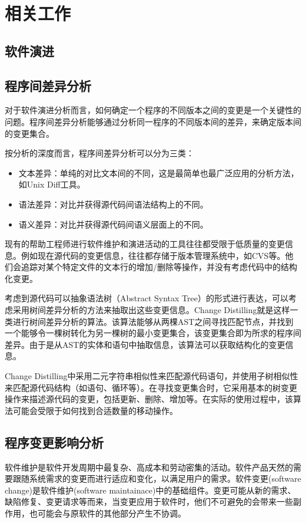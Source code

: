 \chapter{相关工作}
\section{软件演进}
\section{程序间差异分析}

对于软件演进分析而言，如何确定一个程序的不同版本之间的变更是一个关键性的问题。程序间差异分析能够通过分析同一程序的不同版本间的差异，来确定版本间的变更集合。

按分析的深度而言，程序间差异分析可以分为三类：
\begin{itemize}
	\item 文本差异：单纯的对比文本间的不同，这是最简单也最广泛应用的分析方法，如Unix Diff工具。
	\item 语法差异：对比并获得源代码间语法结构上的不同。
	\item 语义差异：对比并获得源代码间语义层面上的不同。
\end{itemize}

现有的帮助工程师进行软件维护和演进活动的工具往往都受限于低质量的变更信息。例如现在源代码的变更信息，往往都存储于版本管理系统中，如CVS等。他们会追踪对某个特定文件的文本行的增加/删除等操作，并没有考虑代码中的结构化变更。

考虑到源代码可以抽象语法树（Abstract Syntax Tree）的形式进行表达，可以考虑采用树间差异分析的方法来抽取出这些变更信息。Change Distilling就是这样一类进行树间差异分析的算法。该算法能够从两棵AST之间寻找匹配节点，并找到一个能够令一棵树转化为另一棵树的最小变更集合，该变更集合即为所求的程序间差异。由于是从AST的实体和语句中抽取信息，该算法可以获取结构化的变更信息。

Change Distilling中采用二元字符串相似性来匹配源代码语句，并使用子树相似性来匹配源代码结构（如语句、循环等）。在寻找变更集合时，它采用基本的树变更操作来描述源代码的变更，包括更新、删除、增加等。在实际的使用过程中，该算法可能会受限于如何找到合适数量的移动操作。

\section{程序变更影响分析}
软件维护是软件开发周期中最复杂、高成本和劳动密集的活动。软件产品天然的需要跟随系统需求的变更而进行适应和变化，以满足用户的需求。软件变更(software change)是软件维护(software maintainace)中的基础组件。变更可能从新的需求、缺陷修复、变更请求等而来，当变更应用于软件时，他们不可避免的会带来一些副作用，也可能会与原软件的其他部分产生不协调。

